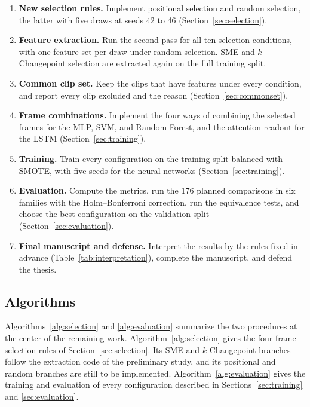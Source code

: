 \begin{enumerate}
   \item \textbf{New selection rules.} Implement positional selection and random selection, the latter with five draws at seeds 42 to 46 (Section~\ref{sec:selection}).
   \item \textbf{Feature extraction.} Run the second pass for all ten selection conditions, with one feature set per draw under random selection. SME and $k$-Changepoint selection are extracted again on the full training split.
   \item \textbf{Common clip set.} Keep the clips that have features under every condition, and report every clip excluded and the reason (Section~\ref{sec:commonset}).
   \item \textbf{Frame combinations.} Implement the four ways of combining the selected frames for the MLP, SVM, and Random Forest, and the attention readout for the LSTM (Section~\ref{sec:training}).
   \item \textbf{Training.} Train every configuration on the training split balanced with SMOTE, with five seeds for the neural networks (Section~\ref{sec:training}).
   \item \textbf{Evaluation.} Compute the metrics, run the 176 planned comparisons in six families with the Holm--Bonferroni correction, run the equivalence tests, and choose the best configuration on the validation split (Section~\ref{sec:evaluation}).
   \item \textbf{Final manuscript and defense.} Interpret the results by the rules fixed in advance (Table~\ref{tab:interpretation}), complete the manuscript, and defend the thesis.
\end{enumerate}

\subsection{Algorithms}
\label{sec:algorithms}

Algorithms~\ref{alg:selection} and \ref{alg:evaluation} summarize the two procedures at the center of the remaining work. Algorithm~\ref{alg:selection} gives the four frame selection rules of Section~\ref{sec:selection}. Its SME and $k$-Changepoint branches follow the extraction code of the preliminary study, and its positional and random branches are still to be implemented. Algorithm~\ref{alg:evaluation} gives the training and evaluation of every configuration described in Sections~\ref{sec:training} and \ref{sec:evaluation}.


